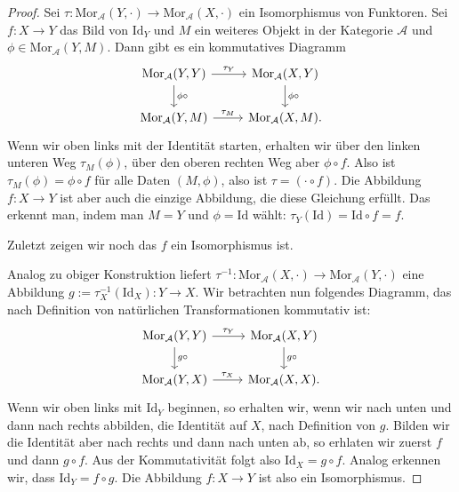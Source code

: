 \documentclass[leqno]{article}
\theoremstyle{plain}
\theoremstyle{definition}
\theoremstyle{remark}
\begin{document}
\begin{proof}
Sei $\tau: \text{Mor}_{\mathcal{A}}(Y,\cdot) \rightarrow \text{Mor}_{\mathcal{A}}(X,\cdot)$ ein Isomorphismus von Funktoren. Sei $f: X \rightarrow Y$ das Bild von $\text{Id}_Y$ und $M$ ein weiteres Objekt in der Kategorie $\mathcal{A}$ und $\phi \in \text{Mor}_\mathcal{A}(Y,M)$. Dann gibt es ein kommutatives Diagramm
\begin{equation}
	\begin{tikzcd}
	{\text{Mor}_{\mathcal{A}}(Y,Y)} \arrow[d, "\phi \circ"] \arrow[r, "\tau_Y"] & {\text{Mor}_{\mathcal{A}}(X,Y)} \arrow[d, "\phi \circ"] \\
	{\text{Mor}_{\mathcal{A}}(Y,M)} \arrow[r, "\tau_M"]                         & {\text{Mor}_{\mathcal{A}}(X,M)}.                        
	\end{tikzcd}
\end{equation}
Wenn wir oben links mit der Identität starten, erhalten wir über den linken unteren Weg $\tau_M(\phi)$, über den oberen rechten Weg aber $\phi \circ f$. Also ist $\tau_M(\phi) = \phi \circ f$ für alle Daten $(M,\phi)$, also ist $\tau = (\cdot \circ f)$. Die Abbildung $f:X \rightarrow Y$ ist aber auch die einzige Abbildung, die diese Gleichung erfüllt. Das erkennt man, indem man $M = Y$ und $\phi = \text{Id}$ wählt: $\tau_Y(\text{Id}) = \text{Id} \circ f = f$.

Zuletzt zeigen wir noch das $f$ ein Isomorphismus ist.

Analog zu obiger Konstruktion liefert $\tau^{-1}: \text{Mor}_{\mathcal{A}}(X,\cdot) \rightarrow \text{Mor}_{\mathcal{A}}(Y,\cdot)$ eine Abbildung $g := \tau^{-1}_X (\text{Id}_X): Y \rightarrow X$. Wir betrachten nun folgendes Diagramm, das nach Definition von natürlichen Transformationen kommutativ ist:
\begin{equation}
	\begin{tikzcd}
	{\text{Mor}_{\mathcal{A}}(Y,Y)} \arrow[d, "g \circ"] \arrow[r, "\tau_Y"] & {\text{Mor}_{\mathcal{A}}(X,Y)} \arrow[d, "g \circ"] \\
	{\text{Mor}_{\mathcal{A}}(Y,X)} \arrow[r, "\tau_X"]                      & {\text{Mor}_{\mathcal{A}}(X,X)}.                     
	\end{tikzcd}
\end{equation}
Wenn wir oben links mit $\text{Id}_Y$ beginnen, so erhalten wir, wenn wir nach unten und dann nach rechts abbilden, die Identität auf $X$, nach Definition von $g$. Bilden wir die Identität aber nach rechts und dann nach unten ab, so erhlaten wir zuerst $f$ und dann $g \circ f$. Aus der Kommutativität folgt also $\text{Id}_X = g \circ f$. Analog erkennen wir, dass $\text{Id}_Y = f \circ g$. Die Abbildung $f:X \rightarrow Y$ ist also ein Isomorphismus.
\end{proof}
\end{document}
